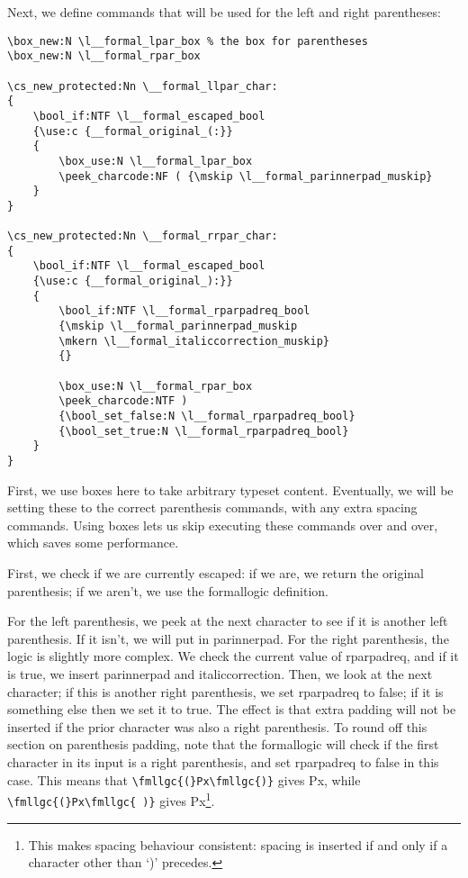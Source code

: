 \documentclass{article}
\begin{document}
\noindent Next, we define commands that will be used for the left and right parentheses:
\begin{Verbatim}
\box_new:N \l__formal_lpar_box % the box for parentheses
\box_new:N \l__formal_rpar_box

\cs_new_protected:Nn \__formal_llpar_char:
{
    \bool_if:NTF \l__formal_escaped_bool 
    {\use:c {__formal_original_(:}}
    {
        \box_use:N \l__formal_lpar_box 
        \peek_charcode:NF ( {\mskip \l__formal_parinnerpad_muskip}
    }
}

\cs_new_protected:Nn \__formal_rrpar_char:
{
    \bool_if:NTF \l__formal_escaped_bool
    {\use:c {__formal_original_):}}
    {
        \bool_if:NTF \l__formal_rparpadreq_bool 
        {\mskip \l__formal_parinnerpad_muskip 
        \mkern \l__formal_italiccorrection_muskip} 
        {}
        
        \box_use:N \l__formal_rpar_box
        \peek_charcode:NTF ) 
        {\bool_set_false:N \l__formal_rparpadreq_bool} 
        {\bool_set_true:N \l__formal_rparpadreq_bool}
    }
}
\end{Verbatim}
First, we use boxes here to take arbitrary typeset content. Eventually, we will be setting these to the correct parenthesis commands, with any extra spacing commands. Using boxes lets us skip executing these commands over and over, which saves some performance. 

First, we check if we are currently escaped: if we are, we return the original parenthesis; if we aren't, we use the formallogic definition.

For the left parenthesis, we peek at the next character to see if it is another left parenthesis. If it isn't, we will put in parinnerpad. For the right parenthesis, the logic is slightly more complex. We check the current value of rparpadreq, and if it is true, we insert parinnerpad and italiccorrection. Then, we look at the next character; if this is another right parenthesis, we set rparpadreq to false; if it is something else then we set it to true. The effect is that extra padding will not be inserted if the prior character was also a right parenthesis. To round off this section on parenthesis padding, note that the formallogic will check if the first character in its input is a right parenthesis, and set rparpadreq to false in this case. This means that \verb|\fmllgc{(}Px\fmllgc{)}| gives \fmllgc{(}Px\fmllgc{)}, while \verb|\fmllgc{(}Px\fmllgc{ )}| gives \fmllgc{(}Px\fmllgc{ )}\footnote{This makes spacing behaviour consistent: spacing is inserted if and only if a character other than `)' precedes.}.
\\\mbox{}
\end{document}
